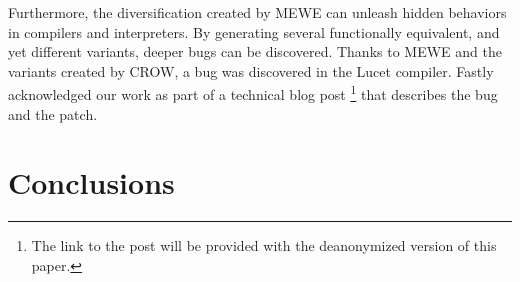
Furthermore, the diversification created by MEWE can unleash hidden behaviors in compilers and interpreters.
By generating several functionally equivalent, and yet different variants, deeper bugs can be discovered. 
Thanks to MEWE and the variants created by CROW, a bug was discovered in the Lucet compiler.
Fastly acknowledged our work as part of a technical blog post 
\footnote{The link to the post will be provided with the  deanonymized version of this paper.} that describes the bug and the patch. 

\section{Conclusions}
\label{sota:conclusions}


